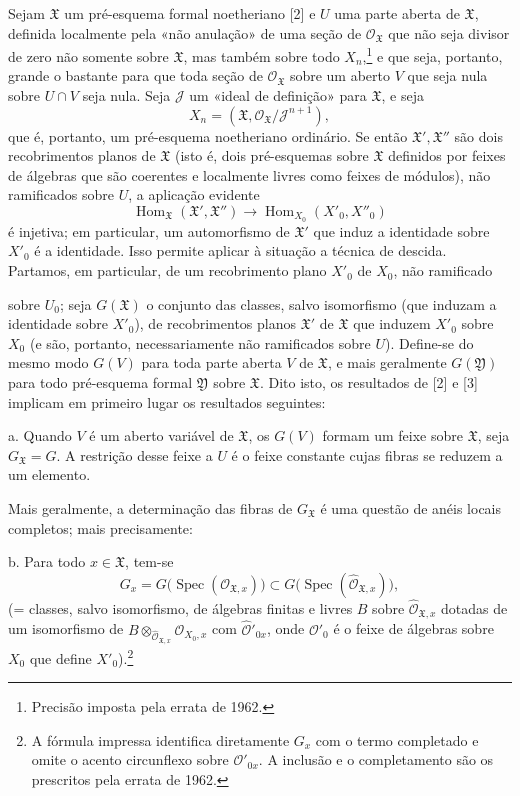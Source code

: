 \documentclass[11pt,twoside,openany]{book}
\numberwithin{equation}{section}
\newcommand{\src}[1]{%
  \phantomsection\hypertarget{src:#1}{}%
  \marginpar{\raggedleft\footnotesize\sffamily #1}%
}
\theoremstyle{plain}
\theoremstyle{definition}
\theoremstyle{remark}
\newcommand{\FgaUnitKey}{frontmatter}
\renewcommand{\src}[1]{%
  \phantomsection\hypertarget{src:\FgaUnitKey:#1}{}%
  \marginpar{\raggedleft\footnotesize\sffamily #1}%
}
\begin{document}
Sejam $\mathfrak X$ um pré-esquema formal noetheriano [2] e $U$ uma parte
aberta de $\mathfrak X$, definida localmente pela «não anulação» de uma
seção de $\mathcal O_{\mathfrak X}$ que não seja divisor de zero não somente sobre
$\mathfrak X$, mas também sobre todo $X_n$,\footnote{Precisão imposta pela
errata de 1962.} e que seja, portanto, grande o bastante para que toda seção
de $\mathcal O_{\mathfrak X}$ sobre um aberto $V$ que seja nula sobre $U\cap V$
seja nula. Seja $\mathcal J$ um «ideal de definição» para $\mathfrak X$, e seja
\[
  X_n=(\mathfrak X,\mathcal O_{\mathfrak X}/\mathcal J^{n+1}),
\]
que é, portanto, um pré-esquema noetheriano ordinário. Se então
$\mathfrak X',\mathfrak X''$ são dois recobrimentos planos de $\mathfrak X$ (isto
é, dois pré-esquemas sobre $\mathfrak X$ definidos por feixes de álgebras que
são coerentes e localmente livres como feixes de módulos), não ramificados sobre
$U$, a aplicação evidente
\[
  \operatorname{Hom}_{\mathfrak X}(\mathfrak X',\mathfrak X'')
  \longrightarrow
  \operatorname{Hom}_{X_0}(X'_0,X''_0)
\]
é injetiva; em particular, um automorfismo de $\mathfrak X'$ que induz a
identidade sobre $X'_0$ é a identidade. Isso permite aplicar à situação a
técnica de descida. Partamos, em particular, de um recobrimento plano $X'_0$
de $X_0$, não ramificado

\src{388}
sobre $U_0$; seja $G(\mathfrak X)$ o conjunto das classes, salvo isomorfismo
(que induzam a identidade sobre $X'_0$), de recobrimentos planos $\mathfrak X'$
de $\mathfrak X$ que induzem $X'_0$ sobre $X_0$ (e são, portanto,
necessariamente não ramificados sobre $U$). Define-se do mesmo modo $G(V)$ para
toda parte aberta $V$ de $\mathfrak X$, e mais geralmente $G(\mathfrak Y)$
para todo pré-esquema formal $\mathfrak Y$ sobre $\mathfrak X$. Dito isto, os
resultados de [2] e [3] implicam em primeiro lugar os resultados seguintes:

\noindent a. Quando $V$ é um aberto variável de $\mathfrak X$, os $G(V)$
formam um feixe sobre $\mathfrak X$, seja $G_{\mathfrak X}=G$. A restrição desse
feixe a $U$ é o feixe constante cujas fibras se reduzem a um elemento.

Mais geralmente, a determinação das fibras de $G_{\mathfrak X}$ é uma
questão de anéis locais completos; mais precisamente:

\noindent b. Para todo $x\in\mathfrak X$, tem-se
\[
  G_x=G\bigl(\operatorname{Spec}(\mathcal O_{\mathfrak X,x})\bigr)
  \subset
  G\bigl(\operatorname{Spec}(\widehat{\mathcal O}_{\mathfrak X,x})\bigr),
\]
(= classes, salvo isomorfismo, de álgebras finitas e livres $B$ sobre
$\widehat{\mathcal O}_{\mathfrak X,x}$ dotadas de um isomorfismo de
$B\otimes_{\widehat{\mathcal O}_{\mathfrak X,x}}\mathcal O_{X_0,x}$ com
$\widehat{\mathcal O}'_{0x}$, onde $\mathcal O'_0$ é o feixe de álgebras sobre
$X_0$ que define $X'_0$).\footnote{A fórmula impressa identifica diretamente
$G_x$ com o termo completado e omite o acento circunflexo sobre
$\mathcal O'_{0x}$. A inclusão e o completamento são os prescritos pela
errata de 1962.}
\end{document}
